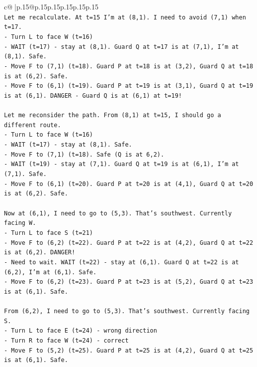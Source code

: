 \documentclass{article}
\begin{document}
{\begin{supertabular}{c@{$\;$}|p{.15\linewidth}@{}p{.15\linewidth}p{.15\linewidth}p{.15\linewidth}p{.15\linewidth}p{.15\linewidth}}
{{{\\ 
\texttt{Let me recalculate. At t=15 I'm at (8,1). I need to avoid (7,1) when t=17.} \\
\texttt{{-} Turn L to face W (t=16)} \\
\texttt{{-} WAIT (t=17) {-} stay at (8,1). Guard Q at t=17 is at (7,1), I'm at (8,1). Safe.} \\
\texttt{{-} Move F to (7,1) (t=18). Guard P at t=18 is at (3,2), Guard Q at t=18 is at (6,2). Safe.} \\
\texttt{{-} Move F to (6,1) (t=19). Guard P at t=19 is at (3,1), Guard Q at t=19 is at (6,1). DANGER {-} Guard Q is at (6,1) at t=19!} \\
\\ 
\texttt{Let me reconsider the path. From (8,1) at t=15, I should go a different route.} \\
\texttt{{-} Turn L to face W (t=16)} \\
\texttt{{-} WAIT (t=17) {-} stay at (8,1). Safe.} \\
\texttt{{-} Move F to (7,1) (t=18). Safe (Q is at 6,2).} \\
\texttt{{-} WAIT (t=19) {-} stay at (7,1). Guard Q at t=19 is at (6,1), I'm at (7,1). Safe.} \\
\texttt{{-} Move F to (6,1) (t=20). Guard P at t=20 is at (4,1), Guard Q at t=20 is at (6,2). Safe.} \\
\\ 
\texttt{Now at (6,1), I need to go to (5,3). That's southwest. Currently facing W.} \\
\texttt{{-} Turn L to face S (t=21)} \\
\texttt{{-} Move F to (6,2) (t=22). Guard P at t=22 is at (4,2), Guard Q at t=22 is at (6,2). DANGER!} \\
\texttt{{-} Need to wait. WAIT (t=22) {-} stay at (6,1). Guard Q at t=22 is at (6,2), I'm at (6,1). Safe.} \\
\texttt{{-} Move F to (6,2) (t=23). Guard P at t=23 is at (5,2), Guard Q at t=23 is at (6,1). Safe.} \\
\\ 
\texttt{From (6,2), I need to go to (5,3). That's southwest. Currently facing S.} \\
\texttt{{-} Turn L to face E (t=24) {-} wrong direction} \\
\texttt{{-} Turn R to face W (t=24) {-} correct} \\
\texttt{{-} Move F to (5,2) (t=25). Guard P at t=25 is at (4,2), Guard Q at t=25 is at (6,1). Safe.} \\
}}}
\end{supertabular}}
\end{document}
